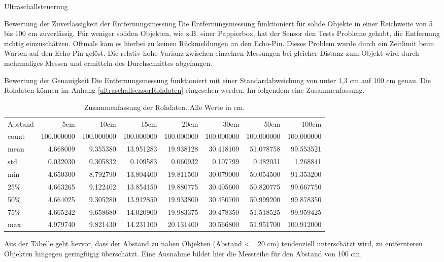 \documentclass[12pt,twoside]{report}
\begin{document}
\begin{section}{Ultraschallsteuerung}
    \begin{subsection}{Bewertung der Zuverlässigkeit der Entfernungsmessung}
      Die Entfernungsmessung funktioniert für solide Objekte in einer Reichweite
      von 5 bis 100 cm zuverlässig. Für weniger soliden Objekten, wie z.B. einer
      Pappierbox, hat der Sensor den Tests Probleme
      gehabt, die Entfernung richtig einzuschätzen. Oftmals kam es hierbei zu keinen Rückmeldungen an den Echo-Pin. Dieses
      Problem wurde durch ein Zeitlimit beim Warten auf den Echo-Pin gelöst.
      Die relativ hohe Varianz zwischen einzelnen Messungen bei gleicher Distanz zum Objekt
      wird durch mehrmaliges Messen und ermitteln des Durchschnittes abgefangen.
    \end{subsection}
    \begin{subsection}{Bewertung der Genauigkeit}
      Die Entfernungsmessung funktioniert mit einer Standardabweichung von unter
      1,3 cm auf 100 cm genau.
      Die Rohdaten können im Anhang \ref{ultraschallsensorRohdaten} eingesehen werden.
      Im folgendem eine Zusammenfassung.
      \begin{table}[h!]
        \begin{tabular}{lrrrrrrr}
          Abstand &       5cm &        10cm &        15cm &        20cm &        30cm &        50cm &       100cm \\
          count &  100.000000 &  100.000000 &  100.000000 &  100.000000 &  100.000000 &  100.000000 &  100.000000 \\
          mean  &    4.668009 &    9.355380 &   13.951283 &   19.938128 &   30.418109 &   51.078758 &   99.553521 \\
          std   &    0.032030 &    0.305832 &    0.109583 &    0.060932 &    0.107799 &    0.482031 &    1.268841 \\
          min   &    4.650300 &    8.792790 &   13.804400 &   19.811500 &   30.079000 &   50.054500 &   91.353200 \\
          25\%   &    4.663265 &    9.122402 &   13.854150 &   19.880775 &   30.405600 &   50.820775 &   99.667750 \\
          50\%   &    4.664025 &    9.305280 &   13.912850 &   19.933800 &   30.450700 &   50.999200 &   99.878350 \\
          75\%   &    4.665242 &    9.658680 &   14.020900 &   19.983375 &   30.478350 &   51.518525 &   99.959425 \\
          max   &    4.979740 &    9.821430 &   14.231100 &   20.131400 &   30.566800 &   51.951700 &  100.912000 \\
        \end{tabular}
        \caption{Zusammenfassung der Rohdaten. Alle Werte in cm.}
    \end{table}
    Aus der Tabelle geht hervor, dass der Abstand zu nahen
    Objekten (Abstand <= 20 cm) tendenziell unterschätzt wird, zu entfernteren
    Objekten hingegen geringfügig überschätzt. Eine Ausnahme bildet hier die
    Messreihe für den Abstand von 100 cm.
    

\end{subsection}
\end{section}
\end{document}

